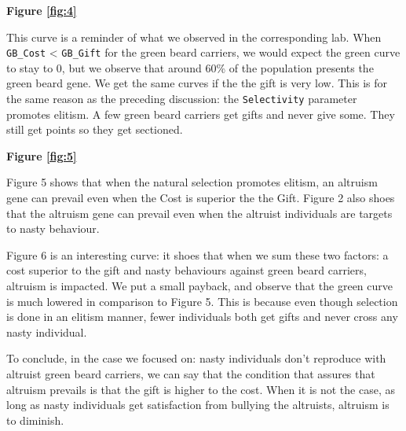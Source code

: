 \documentclass[12pt,a4paper]{article}
\newcommand{\parag}[1]{
  \vspace{8mm}
  \noindent
  {\LARGE\textbf{#1}}
  \vspace{3mm}
}
\begin{document}
\vspace{5mm}
\noindent\textbf{Figure \ref{fig:4}}
\vspace{1.5mm}

This curve is a reminder of what we observed in the corresponding lab. When \texttt{GB\_Cost} < \texttt{GB\_Gift} for the green beard carriers, we would expect the green curve to stay to 0, but we observe that around 60\% of the population presents the green beard gene. We get the same curves if the the gift is very low. This is for the same reason as the preceding discussion: the \texttt{Selectivity} parameter promotes elitism. A few green beard carriers get gifts and never give some. They still get points so they get sectioned.

\vspace{5mm}
\noindent\textbf{Figure \ref{fig:5}}
\vspace{1.5mm}

Figure 5 shows that when the natural selection promotes elitism, an altruism gene can prevail even when the Cost is superior the the Gift. Figure 2 also shoes that the altruism gene can prevail even when the altruist individuals are targets to nasty behaviour.

Figure 6 is an interesting curve: it shoes that when we sum these two factors: a cost superior to the gift and nasty behaviours against green beard carriers, altruism is impacted. We put a small payback, and observe that the green curve is much lowered in comparison to Figure 5. This is because even though selection is done in an elitism manner, fewer individuals both get gifts and never cross any nasty individual.

To conclude, in the case we focused on: nasty individuals don’t reproduce with altruist green beard carriers, we can say that the condition that assures that altruism prevails is that the gift is higher to the cost. When it is not the case, as long as nasty individuals get satisfaction from bullying the altruists, altruism is to diminish.


\end{document}
